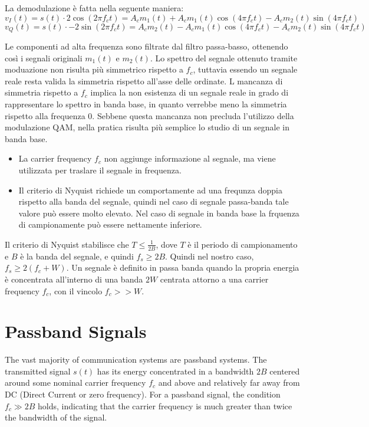 La demodulazione è fatta nella seguente maniera:
\begin{equation}
    v_I(t) = s(t) \cdot 2\cos(2\pi f_c t) = A_{c} m_1(t) + A_{c} m_1(t) \cos(4\pi f_c t) - A_{c} m_2(t) \sin(4\pi f_c t)
\end{equation}
\begin{equation}
    v_Q(t) = s(t) \cdot -2\sin(2\pi f_c t) = A_{c} m_2(t) - A_{c} m_1(t) \cos(4\pi f_c t) - A_{c} m_2(t) \sin(4\pi f_c t)
\end{equation}

Le componenti ad alta frequenza sono filtrate dal filtro passa-basso, ottenendo così i segnali originali \( m_1(t) \) e \( m_2(t) \).
Lo spettro del segnale ottenuto tramite moduazione non risulta più simmetrico rispetto a $f_c$, tuttavia essendo un segnale reale resta valida la simmetria rispetto all'asse delle ordinate.
L mancanza di simmetria rispetto a $f_c$ implica la non esistenza di un segnale reale in grado di rappresentare lo spettro in banda base, in quanto verrebbe meno la simmetria rispetto alla frequenza 0.
Sebbene questa mancanza non precluda l'utilizzo della modulazione QAM, nella pratica risulta più semplice lo studio di un segnale in banda base.
\begin{itemize}
    \item La carrier frequency \( f_c \) non aggiunge informazione al segnale, ma viene utilizzata per traslare il segnale in frequenza.
    \item Il criterio di Nyquist richiede un comportamente ad una frequnza doppia rispetto alla banda del segnale, quindi nel caso di segnale passa-banda tale valore può essere molto elevato. Nel caso di segnale in banda base la frquenza di campionamente può essere nettamente inferiore.
\end{itemize}

Il criterio di Nyquist stabilisce che \( T \leq \frac{1}{2B} \), dove \( T \) è il periodo di campionamento e \( B \) è la banda del segnale, e quindi \( f_s \geq 2B \). Quindi nel nostro caso, $f_s \geq 2(f_c + W)$.
Un segnale è definito in passa banda quando la propria energia è concentrata all'interno di una banda $2W$ centrata attorno a una carrier frequency $f_c$, con il vincolo $f_c >> W$.  
\section*{Passband Signals}

The vast majority of communication systems are passband systems. The transmitted signal \( s(t) \) has its energy concentrated in a bandwidth \( 2B \) centered around some nominal carrier frequency \( f_c \) and above and relatively far away from DC (Direct Current or zero frequency). For a passband signal, the condition \( f_c \gg 2B \) holds, indicating that the carrier frequency is much greater than twice the bandwidth of the signal.

